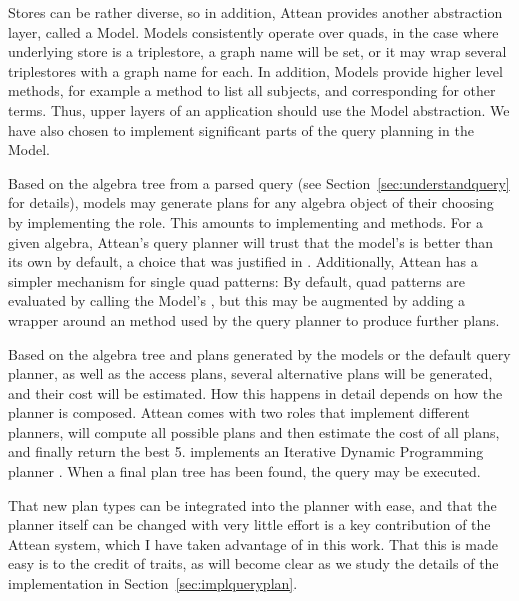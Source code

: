 Stores can be rather diverse, so in addition, Attean provides another
abstraction layer, called a Model. Models consistently operate over
quads, in the case where underlying store is a triplestore, a graph
name will be set, or it may wrap several triplestores with a graph
name for each. In addition, Models provide higher level methods,
for example a  method to list all subjects, and
corresponding for other terms. Thus, upper layers of an application
should use the Model abstraction. We have also chosen to implement significant
parts of the query planning in the Model.

Based on the algebra tree from a parsed query (see
Section~\ref{sec:understandquery} for details), models may generate
plans for any algebra object of
their choosing by implementing the 
role. This amounts to implementing  and
 methods. For a given algebra, Attean's query
planner will trust that the model's  is
better than its own by default, a choice that was justified in
\cite{williamspushing}. Additionally, Attean has a simpler mechanism
for single quad patterns: By default, quad patterns are evaluated by
calling the Model's , but this may be augmented by
adding a wrapper around an  method used by the
query planner to produce further plans.

Based on the algebra tree and plans generated by the models or the
default query planner, as well as the access plans, several
alternative plans will be generated, and their cost will be
estimated. How this happens in detail depends on how the planner is
composed. Attean comes with two roles that implement different
planners,  will compute all
possible plans and then estimate the cost of all plans, and finally
return the best 5.  implements an
Iterative Dynamic Programming planner
\cite{Kossmann:2000:IDP:352958.352982}. When a final plan tree has
been found, the query may be executed.

That new plan types can be integrated into the planner with ease, and
that the planner itself can be changed with very little effort is a
key contribution of the Attean system, which I have taken advantage of
in this work. That this is made easy is to the credit of traits, as
will become clear as we study the details of the implementation in
Section~\ref{sec:implqueryplan}.



